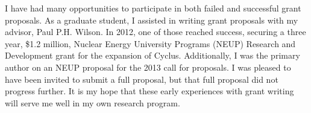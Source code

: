 \documentclass[a4paper, 10pt]{article}
\begin{document}
I have had many opportunities to participate in both failed and successful grant 
proposals.  As a graduate student, I assisted in writing grant proposals with my 
advisor, Paul P.H. Wilson. In 2012, one of those reached success, securing a 
three year, \$1.2 million, Nuclear Energy University Programs (NEUP) Research 
and Development grant for the expansion of Cyclus. Additionally, I was the 
primary author on an NEUP proposal for the 2013 call for proposals. I was 
pleased to have been invited to submit a full proposal, but that full proposal 
did not progress further. It is my hope that these early experiences with grant 
writing will serve me well in my own research program.






\end{document}

